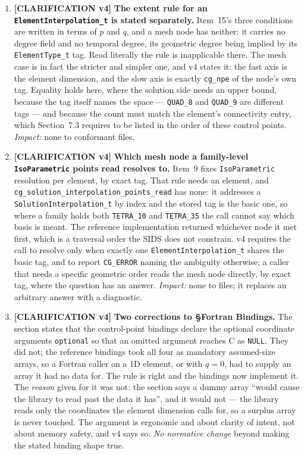 \documentclass[11pt,letterpaper]{article}
\newif\ifvfourdraft
\newenvironment{v4block}{\ifvfourdraft\color{v4violet}\fi\ignorespaces}{\par}
\newcommand{\CLARIFYIV}{\ifvfourdraft
  \textcolor{v4violet}{\textbf{[CLARIFICATION v4]}}\else
  \textcolor{clarifybrown}{\textbf{[CLARIFICATION v4]}}\fi}
\begin{document}
{\begin{v4block}
\begin{enumerate}[leftmargin=1.4em,itemsep=0.5em]
  \item \CLARIFYIV{} \textbf{The extent rule for an \texttt{ElementInterpolation\_t}
    is stated separately.}  Item~15's three conditions are written in terms of $p$
    and $q$, and a mesh node has neither: it carries no degree field and no
    temporal degree, its geometric degree being implied by its
    \texttt{ElementType\_t} tag.  Read literally the rule is inapplicable there.
    The mesh case is in fact the stricter and simpler one, and v4 states it: the
    fast axis is the element dimension, and the slow axis is exactly
    \texttt{cg\_npe} of the node's own tag.  Equality holds here, where the
    solution side needs an upper bound, because the tag itself names the space ---
    \texttt{QUAD\_8} and \texttt{QUAD\_9} are different tags --- and because the
    count must match the element's connectivity entry, which Section~7.3 requires
    to be listed in the order of these control points.
    \textit{Impact:} none to conformant files.

  \item \CLARIFYIV{} \textbf{Which mesh node a family-level
    \texttt{IsoParametric} points read resolves to.}  Item~9 fixes
    \texttt{IsoParametric} resolution per element, by exact tag.  That rule needs
    an element, and \texttt{cg\_solution\_interpolation\_points\_read} has none:
    it addresses a \texttt{SolutionInterpolation\_t} by index and the stored tag
    is the basic one, so where a family holds both \texttt{TETRA\_10} and
    \texttt{TETRA\_35} the call cannot say which basis is meant.  The reference
    implementation returned whichever node it met first, which is a traversal
    order the SIDS does not constrain.  v4 requires the call to resolve only when
    exactly one \texttt{ElementInterpolation\_t} shares the basic tag, and to
    report \texttt{CG\_ERROR} naming the ambiguity otherwise; a caller that needs a
    specific geometric order reads the mesh node directly, by exact tag, where the
    question has an answer.  \textit{Impact:} none to files; it replaces an
    arbitrary answer with a diagnostic.

  \item \CLARIFYIV{} \textbf{Two corrections to \S Fortran Bindings.}  The section
    states that the control-point bindings declare the optional coordinate
    arguments \texttt{optional} so that an omitted argument reaches C as
    \texttt{NULL}.  They did not; the reference bindings took all four as
    mandatory assumed-size arrays, so a Fortran caller on a 1D element, or with
    $q=0$, had to supply an array it had no data for.  The rule is right and the
    bindings now implement it.  The \emph{reason} given for it was not: the
    section says a dummy array ``would cause the library to read past the data it
    has'', and it would not --- the library reads only the coordinates the element
    dimension calls for, so a surplus array is never touched.  The argument is
    ergonomic and about clarity of intent, not about memory safety, and v4 says
    so.  \textit{No normative change} beyond making the stated binding shape true.


\end{enumerate}
\end{v4block}}
\end{document}
